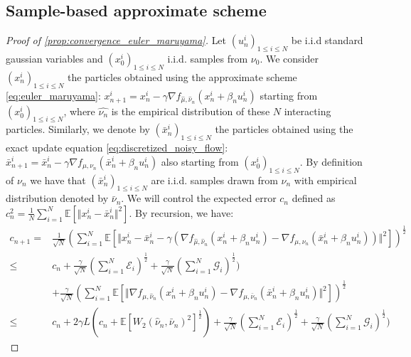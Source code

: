 \subsection{Sample-based approximate scheme}
\begin{proof}[Proof of \cref{prop:convergence_euler_maruyama}]\label{proof:propagation_chaos}
Let $(u_{n}^{i})_{1\leq i\leq N}$ be i.i.d standard gaussian variables and $(x_{0}^{i})_{1\leq i\leq N}$ i.i.d. samples from $\nu_0$. We consider $(x_n^i)_{1\leq i\leq N}$ the particles obtained using the approximate scheme \cref{eq:euler_maruyama}: $x_{n+1}^{i}=x_{n}^{i}-\gamma\nabla f_{\hat{\mu},\hat{\nu}_{n}}(x_{n}^{i}+\beta_{n}u_{n}^{i})$ starting from $(x_{0}^{i})_{1\leq i\leq N}$, where $\hat{\nu_n}$ is the empirical distribution of these $N$ interacting particles. Similarly, we denote by $(\bar{x}_{n}^{i})_{1\leq i\leq N}$ the particles obtained using the exact update equation \cref{eq:discretized_noisy_flow}: $\bar{x}_{n+1}^{i}=\bar{x}_{n}^{i}-\gamma\nabla f_{\mu,\nu_{n}}(\bar{x}_{n}^{i}+\beta_{n}u_{n}^{i})$ also starting from $(x_{0}^{i})_{1\leq i\leq N}$.
By definition of $\nu_n$ we have that  $(\bar{x}_{n}^{i})_{1\leq i\leq N}$ are i.i.d. samples drawn from $\nu_n$ with empirical distribution denoted by $\bar{\nu}_{n}$.
We will control the expected error $c_{n}$ defined as  $c^2_{n}= \frac{1}{N}\sum_{i=1}^N \mathbb{E}\left[\Vert x_{n}^{i}-\bar{x}_{n}^{i}\Vert^{2}\right]$. By recursion, we have:
\begin{align*}
c_{n+1} = & \frac{1}{\sqrt{N}}\left(\sum_{i=1}^{N}\mathbb{E}\left[\Vert x_{n}^{i}-\bar{x}_{n}^{i}-\gamma(\nabla f_{\hat{\mu},\hat{\nu}_{n}}(x_{n}^{i}+\beta_{n}u_{n}^{i})-\nabla f_{\mu,\nu_{n}}(\bar{x}_{n}^{i}+\beta_{n}u_{n}^{i}))\Vert^{2}\right]\right)^{\frac{1}{2}}\label{eq:main_inequality_c_n_1}\\
\leq &  c_{n} +\frac{\gamma}{\sqrt{N}}(\sum_{i=1}^{N}\mathcal{E}_{i})^{\frac{1}{2}}+\frac{\gamma}{\sqrt{N}}(\sum_{i=1}^{N}\mathcal{G}_{i})^{\frac{1}{2}})  \\
& +\frac{\gamma}{\sqrt{N}}(\sum_{i=1}^{N}\mathbb{E}[\Vert\nabla f_{\mu,\hat{\nu}_{n}}(x_{n}^{i}+\beta_{n}u_{n}^{i})-\nabla f_{\mu,\bar{\nu}_{n}}(\bar{x}_{n}^{i}+\beta_{n}u_{n}^{i})\Vert^{2}])^{\frac{1}{2}}\\
  \leq & c_{n}+2\gamma L(c_{n}+\mathbb{E}[W_{2}(\hat{\nu}_{n},\bar{\nu}_{n})^{2}]^{\frac{1}{2}})+\frac{\gamma}{\sqrt{N}}(\sum_{i=1}^{N}\mathcal{E}_{i})^{\frac{1}{2}}+\frac{\gamma}{\sqrt{N}}(\sum_{i=1}^{N}\mathcal{G}_{i})^{\frac{1}{2}})

\end{align*}
\end{proof}
